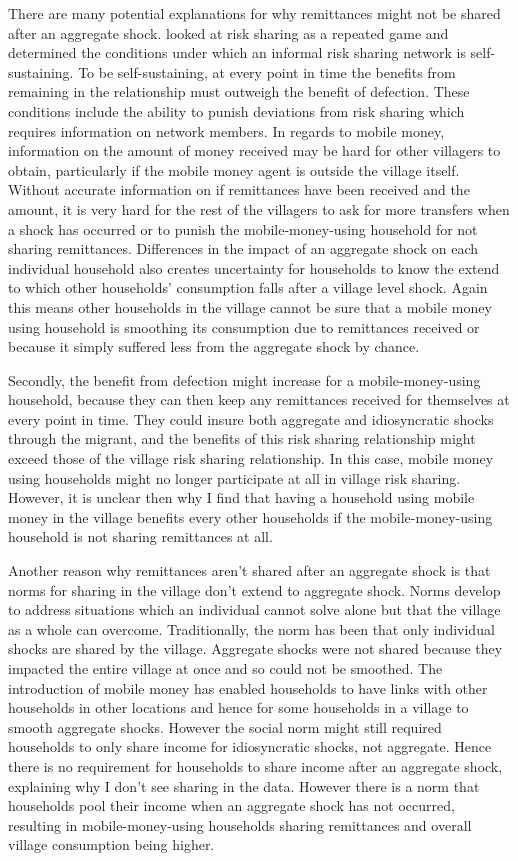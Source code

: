 There are many potential explanations for why remittances might not be shared after an aggregate shock. \cite{coate1993} looked at risk sharing as a repeated game and determined the conditions under which an informal risk sharing network is self-sustaining. To be self-sustaining, at every point in time the benefits from remaining in the relationship must outweigh the benefit of defection. These conditions include the ability to punish  deviations from risk sharing which requires information on network members. In regards to mobile money, information on the amount of money received may be hard for other villagers to obtain, particularly if the mobile money agent is outside the village itself. Without accurate information on if remittances have been received and the amount, it is very hard for the rest of the villagers to ask for more transfers when a shock has occurred or to punish the mobile-money-using household for not sharing remittances. Differences in the impact of an aggregate shock on each individual household also creates uncertainty for households to know the extend to which other households' consumption falls after a village level shock. Again this means other households in the village cannot be sure that a mobile money using household is smoothing its consumption due to remittances received or because it simply suffered less from the aggregate shock by chance. 

Secondly, the benefit from defection might increase for a mobile-money-using household, because they can then keep any remittances received for themselves at every point in time. They could insure both aggregate and idiosyncratic shocks through the migrant, and the benefits of this risk sharing relationship might exceed those of the village risk sharing relationship. In this case, mobile money using households might no longer participate at all in village risk sharing. However, it is unclear then why I find that having a household using mobile money in the village  benefits every other households if the mobile-money-using household is not sharing remittances at all.  

Another reason why remittances aren't shared after an aggregate shock is that norms for sharing in the village don't extend to aggregate shock. Norms develop to address situations which an individual cannot solve alone but that the village as a whole can overcome. Traditionally, the norm has been that only individual shocks are shared by the village. Aggregate shocks were not shared because they impacted the entire village at once and so could not be smoothed. The introduction of mobile money has enabled households to have links with other households in other locations and hence for some households in a village to smooth aggregate shocks. However the social norm might still required households to only share income for idiosyncratic shocks, not aggregate. Hence there is no requirement for households to share income after an aggregate shock, explaining why I don't see sharing in the data. However there is a norm that households pool their income when an aggregate shock has not occurred, resulting in mobile-money-using households sharing remittances and overall village consumption being higher.

